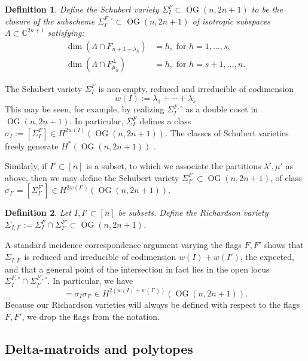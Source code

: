 \documentclass[12pt]{amsart}
\newtheorem{definition}{Definition}[subsection]
\DeclareMathOperator{\OG}{OG}
\newcommand{\bC}{\mathbb{C}}
\begin{document}
\begin{definition}\label{def:schubert}
Define the \emph{Schubert variety} $\Sigma_I^F\subset\OG(n,2n+1)$ to be the closure of the subscheme $\Sigma_I^{F,\circ}\subset\OG(n,2n+1)$ of isotropic subspaces $\Lambda\subset\bC^{2n+1}$ satisfying:
\begin{align*}
    \dim(\Lambda\cap F_{n+1-\lambda_h})&=h,\text{ for }h=1,\ldots,s,\\
    \dim(\Lambda\cap F^\perp_{\mu_h})&=h,\text{ for }h=s+1,\ldots,n.
\end{align*}
\end{definition}
The Schubert variety $\Sigma_I^F$ is non-empty, reduced and irreducible of codimension 
\begin{equation*}
w(I):=\lambda_1+\cdots+\lambda_s
\end{equation*}
This may be seen, for example, by realizing $\Sigma_I^{F,\circ}$ as a double coset in $\OG(n,2n+1)$. In particular, $\Sigma_I^F$ defines a class $\sigma_I:=[\Sigma_I^F]\in H^{2w(I)}(\OG(n,2n+1))$. The classes of Schubert varieties freely generate $H^{*}(\OG(n,2n+1))$ \cite{bgg,borel}.

Similarly, if $I'\subset[n]$ is a subset, to which we associate the partitions $\lambda',\mu'$ as above, then we may define the Schubert variety $\Sigma_{I'}^{F'}\subset\OG(n,2n+1)$, of class $\sigma_{I'}=[\Sigma_{I'}^{F'}]\in H^{2w(I')}(\OG(n,2n+1))$.

\begin{definition}\label{def:richardson}
Let $I,I'\subset[n]$ be subsets. Define the \emph{Richardson variety} $\Sigma_{I,I'}:=\Sigma_I^F\cap \Sigma_{I'}^{F'}\subset\OG(n,2n+1)$.
\end{definition}

A standard incidence correspondence argument varying the flags $F,F'$ shows that $\Sigma_{I,I'}$ is reduced and irreducible of codimension $w(I)+w(I')$, the expected, and that a general point of the intersection in fact lies in the open locus $\Sigma_I^{F,\circ}\cap \Sigma_{I'}^{F',\circ}$. In particular, we have
\begin{equation*}
    [\Sigma_{I,I'}]=\sigma_I\sigma_{I'}\in H^{2(w(I)+w(I'))}(\OG(n,2n+1)).
\end{equation*}
Because our Richardson varieties will always be defined with respect to the flags $F,F'$, we drop the flags from the notation.

\subsection{Delta-matroids and polytopes}\label{sec:delta}
\end{document}
